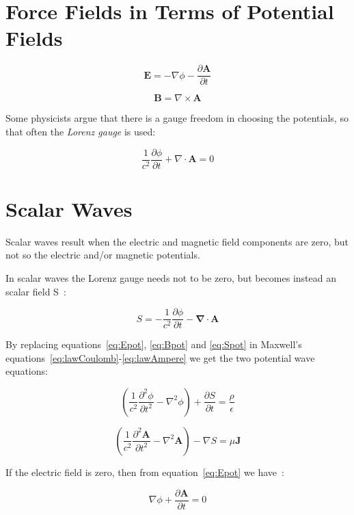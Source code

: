 \documentclass[english, 12pt]{book}
\begin{document}
\section{Force Fields in Terms of Potential Fields}

\begin{equation}
\mathbf{E}=-\nabla\phi - \frac{\partial\mathbf{A}}{\partial t}              \label{eq:Epot}
\end{equation}

\begin{equation}
\mathbf{B}=\nabla\times\mathbf{A}          \label{eq:Bpot}
\end{equation}

Some physicists argue that there is a gauge freedom in choosing the potentials, so that often the \emph{Lorenz gauge} is used:

\[
\frac{1}{c^2} \frac{\partial \phi}{\partial t} + \nabla \cdot \mathbf{A} = 0
\]

\section{Scalar Waves}

Scalar waves result when the electric and magnetic field components are zero, but not so the electric and/or magnetic potentials.

In scalar waves the Lorenz gauge needs not to be zero, but becomes instead an scalar field S~\cite{Vlaen}:

\begin{equation}
S = -\frac{1}{c^{2}}\frac{\partial\phi}{\partial t} - \mathbf{\nabla} \cdot \mathbf{A}      \label{eq:Spot}
\end{equation}

By replacing equations~\ref{eq:Epot}, \ref{eq:Bpot} and \ref{eq:Spot} in Maxwell's equations~\ref{eq:lawCoulomb}-\ref{eq:lawAmpere} we get the two potential wave equations:

\[
\left( \frac{1}{c^{2}}\frac{\partial^{2}\phi}{\partial t^{2}} - \nabla^{2}\phi \right) + \frac{\partial S}{\partial t} = \frac{\rho}{\epsilon}
\]

\[
\left( \frac{1}{c^{2}}\frac{\partial^{2}\mathbf{A}}{\partial t^{2}} - \nabla^{2}\mathbf{A} \right) - \nabla S = \mu \mathbf{J}
\]

If the electric field is zero, then from equation~\ref{eq:Epot} we have~\cite{Dea}:

\begin{equation}
\nabla\phi + \frac{\partial\mathbf{A}}{\partial t} = 0      \label{eq:xi}
\end{equation}
\end{document}
